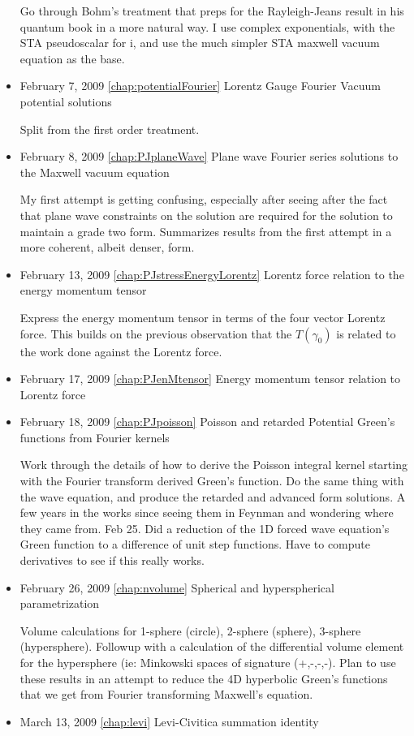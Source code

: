 \begin{itemize}
Go through Bohm's treatment that preps for the Rayleigh-Jeans result in his quantum book in a more natural way.  I use complex exponentials, with the STA pseudoscalar for i, and use the much simpler STA maxwell vacuum equation as the base. \item February 7, 2009 \ref{chap:potentialFourier} Lorentz Gauge Fourier Vacuum potential solutions

Split from the first order treatment. \item February 8, 2009 \ref{chap:PJplaneWave} Plane wave Fourier series solutions to the Maxwell vacuum equation

My first attempt is getting confusing, especially after seeing after the fact that plane wave constraints on the solution are required for the solution to maintain a grade two form.  Summarizes results from the first attempt in a more coherent, albeit denser, form. \item February 13, 2009 \ref{chap:PJstressEnergyLorentz} Lorentz force relation to the energy momentum tensor

Express the energy momentum tensor in terms of the four vector Lorentz force.  This builds on the previous observation that the $T(\gamma_0)$ is related to the work done against the Lorentz force. \item February 17, 2009 \ref{chap:PJenMtensor} Energy momentum tensor relation to Lorentz force

\item February 18, 2009 \ref{chap:PJpoisson} Poisson and retarded Potential Green's functions from Fourier kernels

Work through the details of how to derive the Poisson integral kernel starting with the Fourier transform derived Green's function.  Do the same thing with the wave equation, and produce the retarded and advanced form solutions.  A few years in the works since seeing them in Feynman and wondering where they came from.  Feb 25.  Did a reduction of the 1D forced wave equation's Green function to a difference of unit step functions.  Have to compute derivatives to see if this really works. \item February 26, 2009 \ref{chap:nvolume} Spherical and hyperspherical parametrization

Volume calculations for 1-sphere (circle), 2-sphere (sphere), 3-sphere (hypersphere).  Followup with a calculation of the differential volume element for the hypersphere (ie: Minkowski spaces of signature (+,-,-,-).  Plan to use these results in an attempt to reduce the 4D hyperbolic Green's functions that we get from Fourier transforming Maxwell's equation. \item March 13, 2009 \ref{chap:levi} Levi-Civitica summation identity


\end{itemize}
